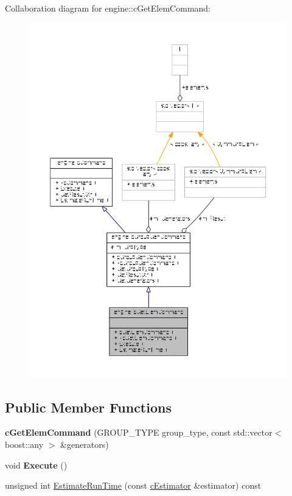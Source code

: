 Collaboration diagram for engine\-:\-:c\-Get\-Elem\-Command\-:
\nopagebreak
\begin{figure}[H]
\begin{center}
\leavevmode
\includegraphics[width=350pt]{classengine_1_1cGetElemCommand__coll__graph}
\end{center}
\end{figure}
\subsection*{Public Member Functions}
\begin{DoxyCompactItemize}
\item 
\hypertarget{classengine_1_1cGetElemCommand_ad7a89645b195be08ff2562ccbde22e6c}{{\bfseries c\-Get\-Elem\-Command} (G\-R\-O\-U\-P\-\_\-\-T\-Y\-P\-E group\-\_\-type, const std\-::vector$<$ boost\-::any $>$ \&generators)}\label{classengine_1_1cGetElemCommand_ad7a89645b195be08ff2562ccbde22e6c}

\item 
\hypertarget{classengine_1_1cGetElemCommand_a16a627c20d55b3f2538bab7f63a04a04}{void {\bfseries Execute} ()}\label{classengine_1_1cGetElemCommand_a16a627c20d55b3f2538bab7f63a04a04}

\item 
unsigned int \hyperlink{classengine_1_1cGetElemCommand_ad84c73fe5b4db65679f28c427d201434}{Estimate\-Run\-Time} (const \hyperlink{classengine_1_1cEstimator}{c\-Estimator} \&estimator) const 
\end{DoxyCompactItemize}
